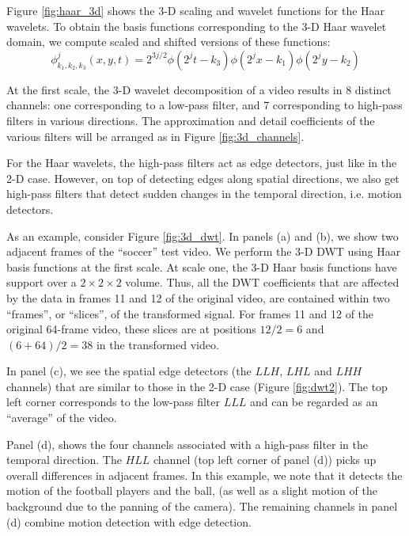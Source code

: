 Figure \ref{fig:haar_3d} shows the 3-D scaling and wavelet functions for the Haar wavelets.
To obtain the basis functions corresponding to the 3-D Haar wavelet domain, we compute scaled and shifted versions of these functions:%
\begin{equation*}
  \phi_{k_1,k_2,k_3}^j(x,y,t) = 2^{3j/2} \phi(2^j t - k_3)\phi(2^j x - k_1) \phi(2^j y - k_2)
\end{equation*}

At the first scale, the 3-D wavelet decomposition of a video results in 8 distinct channels: one corresponding to a low-pass filter, and 7 corresponding to high-pass filters in various directions.
The approximation and detail coefficients of the various filters will be arranged as in Figure \ref{fig:3d_channels}.

For the Haar wavelets, the high-pass filters act as edge detectors, just like in the 2-D case. 
However, on top of detecting edges along spatial directions, we also get high-pass filters that detect sudden changes in the temporal direction, i.e. motion detectors.

As an example, consider Figure \ref{fig:3d_dwt}.
In panels (a) and (b), we show two adjacent frames of the ``soccer'' test video.
We perform the 3-D DWT using Haar basis functions at the first scale.
At scale one, the 3-D Haar basis functions have support over a $2\times 2\times 2$ volume.
Thus, all the DWT coefficients that are affected by the data in frames 11 and 12 of the original video, are contained within two ``frames'', or ``slices'', of the transformed signal.
For frames 11 and 12 of the original 64-frame video, these slices are at positions $12/2=6$ and $(6+64)/2=38$ in the transformed video.

In panel (c), we see the spatial edge detectors (the $LLH$, $LHL$ and $LHH$ channels) that are similar to those in the 2-D case (Figure \ref{fig:dwt2}).
The top left corner corresponds to the low-pass filter $LLL$ and can be regarded as an ``average'' of the video.

Panel (d), shows the four channels associated with a high-pass filter in the temporal direction.
The $HLL$ channel (top left corner of panel (d)) picks up overall differences in adjacent frames.
In this example, we note that it detects the motion of the football players and the ball, (as well as a slight motion of the background due to the panning of the camera).
The remaining channels in panel (d) combine motion detection with edge detection.

